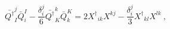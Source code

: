 \begin{equation}
\bar {Q^\dagger}^j_I \bar Q^I_i - 
\frac{\delta^j_i}{6} \bar {Q^\dagger}^k_{K} \bar Q_k^{K} = 
2 {X^\dagger}_{ik} X^{kj} - \frac{\delta^j_i}{3}{X^\dagger}_{kl} X^{lk} ~,
\end{equation}

